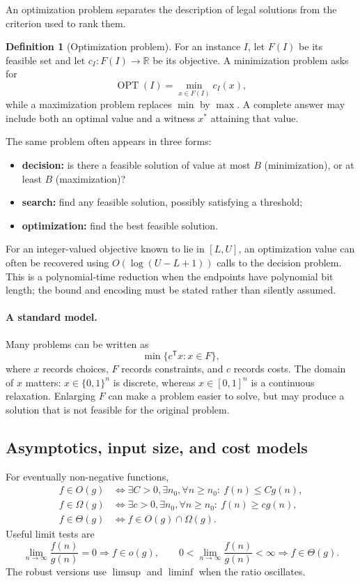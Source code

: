 \documentclass[10pt]{article}
\theoremstyle{definition}
\newtheorem{definition}{Definition}[section]
\newcommand{\OPT}{\operatorname{OPT}}
\begin{document}
An optimization problem separates the description of legal solutions from the
criterion used to rank them.

\begin{definition}[Optimization problem]
For an instance $I$, let $F(I)$ be its feasible set and let
$c_I\colon F(I)\to\mathbb{R}$ be its objective.  A minimization problem asks
for
\[
  \OPT(I)=\min_{x\in F(I)}c_I(x),
\]
while a maximization problem replaces $\min$ by $\max$.  A complete answer may
include both an optimal value and a witness $x^*$ attaining that value.
\end{definition}

The same problem often appears in three forms:
\begin{itemize}
  \item \textbf{decision:} is there a feasible solution of value at most $B$
        (minimization), or at least $B$ (maximization)?
  \item \textbf{search:} find any feasible solution, possibly satisfying a
        threshold;
  \item \textbf{optimization:} find the best feasible solution.
\end{itemize}
For an integer-valued objective known to lie in $[L,U]$, an optimization value
can often be recovered using $O(\log(U-L+1))$ calls to the decision problem.
This is a polynomial-time reduction when the endpoints have polynomial bit
length; the bound and encoding must be stated rather than silently assumed.

\paragraph{A standard model.}
Many problems can be written as
\[
  \min\{c^{\mathsf T}x:x\in F\},
\]
where $x$ records choices, $F$ records constraints, and $c$ records costs.
The domain of $x$ matters: $x\in\{0,1\}^n$ is discrete, whereas
$x\in[0,1]^n$ is a continuous relaxation.  Enlarging $F$ can make a problem
easier to solve, but may produce a solution that is not feasible for the
original problem.

\subsection{Asymptotics, input size, and cost models}

For eventually non-negative functions,
\begin{align*}
f\in O(g)
&\iff \exists C>0,\exists n_0,\forall n\ge n_0:\ f(n)\le Cg(n),\\
f\in \Omega(g)
&\iff \exists c>0,\exists n_0,\forall n\ge n_0:\ f(n)\ge cg(n),\\
f\in \Theta(g)
&\iff f\in O(g)\cap\Omega(g).
\end{align*}
Useful limit tests are
\[
\lim_{n\to\infty}\frac{f(n)}{g(n)}=0\Rightarrow f\in o(g),\qquad
0<\lim_{n\to\infty}\frac{f(n)}{g(n)}<\infty\Rightarrow f\in\Theta(g).
\]
The robust versions use $\limsup$ and $\liminf$ when the ratio oscillates.
\end{document}
